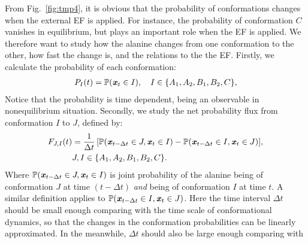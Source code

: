 \documentclass[a4paper,preprint,unsortedaddress,onecolumn]{revtex4-1}
\newcommand{\recheck}[1]{{\color{red} #1}}
\newcommand{\vect}[1]{\textbf{\textit{#1}}}
\newcommand{\fwd}[0]{\textrm{fwd}}
\newcommand{\bwd}[0]{\textrm{bwd}}
\begin{document}
From Fig.~\ref{fig:tmp4}, it is obvious that the probability of
conformations changes when the external EF is applied.
For instance, the probability of conformation $C$ vanishes in equilibrium,
but plays an important role when the EF is applied. We
therefore want to study how the alanine changes from one conformation
to the other, how fast the change is, and the relations to the 
the EF. 
Firstly, we calculate the probability
of each conformation:
\begin{align}
  P_I(t) = \mathbb P (\vect x_t \in I), \quad  I \in \{A_1, A_2, B_1, B_2, C\},
\end{align}
Notice that the probability is time dependent, being an observable in nonequilibrium situation.
Secondly,
we study the net probability flux from conformation $I$ to $J$, defined by:
\begin{align}\nonumber
  F_{J,I}(t) & = \frac1{\Delta t}\, [\mathbb P( \vect x_{t-\Delta t} \in J, \vect x_t \in I) - \mathbb P( \vect x_{t-\Delta t} \in I, \vect x_t \in J)], \\\label{eqn:tmp7}
  & J,I \in \{A_1, A_2, B_1, B_2, C\}.
\end{align}
\recheck{Where $\mathbb P( \vect x_{t-\Delta t} \in J, \vect x_t \in I)$
is joint probability of the alanine being of conformation $J$ at
time $(t-\Delta t)$ \emph{and} being of conformation $I$ at time $t$.
A similar definition applies to $\mathbb P( \vect x_{t-\Delta t} \in I, \vect x_t \in J)$.}
Here the time interval $\Delta t$ should be small enough comparing with the
time scale of conformational dynamics,
so that the changes in the conformation probabilities
can be linearly approximated.
In the meanwhile,  $\Delta t$ should also be  large enough comparing with
\end{document}
